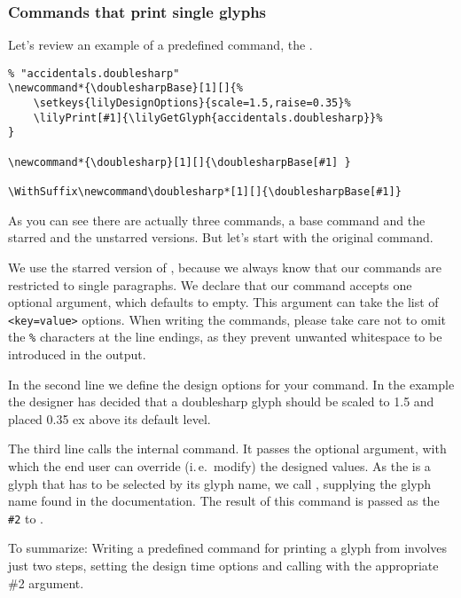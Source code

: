 \documentclass{article}
\begin{document}
\subsubsection{Commands that print single glyphs}
\label{subsubsec:commands_single-glyphs}
Let's review an example of a predefined command, the .

\begin{verbatim}
% "accidentals.doublesharp"
\newcommand*{\doublesharpBase}[1][]{%
    \setkeys{lilyDesignOptions}{scale=1.5,raise=0.35}%
    \lilyPrint[#1]{\lilyGetGlyph{accidentals.doublesharp}}%
}

\newcommand*{\doublesharp}[1][]{\doublesharpBase[#1] }

\WithSuffix\newcommand\doublesharp*[1][]{\doublesharpBase[#1]}
\end{verbatim}
As you can see there are actually three commands, a base command and the starred and the unstarred versions.
But let's start with the original command.

We use the starred version of , because we always know that our commands are restricted to single paragraphs.
We declare that our command accepts one optional argument, which defaults to empty. 
This argument can take the list of \texttt{<key=value>} options.
When writing the commands, please take care not to omit the \texttt{\%} characters at the line endings, as they prevent unwanted whitespace to be introduced in the output.

In the second line we define the design options for your command.
In the example the designer has decided that a doublesharp glyph should be scaled to 1.5 and placed 0.35 ex above its default level.

The third line calls the internal  command. 
It passes the optional argument, with which the end user can override (i.\,e.\ modify) the designed values.
As the \doublesharp is a glyph that has to be selected by its glyph name, we call , supplying the glyph name found in the documentation.
The result of this command is passed as the \texttt{\#2} to .

To summarize: Writing a predefined command for printing a glyph from \emmentaler involves just two steps, setting the design time options and calling  with the appropriate \#2 argument.
\end{document}
